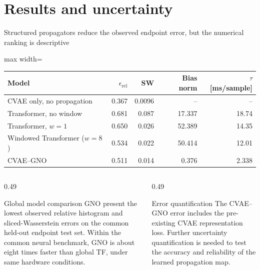 \section{Results and uncertainty}
\begin{frame}[t,shrink=5]{Structured propagators reduce the observed endpoint error, but the numerical ranking is descriptive}
\begin{center}\begin{adjustbox}{max width=\linewidth}
\begin{tabular}{lrrrr}\toprule
Model & $\epsilon_{\mathrm{rel}}$ & SW & Bias norm & $\tau$ [ms/sample]\\\midrule
CVAE only, no propagation & 0.367 & 0.0096 & -- & --\\\midrule
Transformer, no window & 0.681 & 0.087 & 17.337 & 18.74\\
Transformer, $w=1$ & 0.650 & 0.026 & 52.389 & 14.35\\
Windowed Transformer ($w=8$) & 0.534 & 0.022 & 50.414 & 12.01\\
CVAE--GNO & 0.511 & 0.014 & 0.376 & 2.338\\\bottomrule\end{tabular}
\end{adjustbox}\end{center}\begin{columns}[T,onlytextwidth]
\begin{column}{0.49\textwidth}
\begin{block}{Global model comparison}
GNO present the lowest observed relative histogram and sliced-Wasserstein errors on the common held-out endpoint test set. Within the common neural benchmark, GNO is about eight times faster than global TF, under same hardware conditions.
\end{block}

\end{column}
\begin{column}{0.49\textwidth}
\begin{block}{Error quantification}
The CVAE--GNO error includes the pre-existing CVAE representation loss. Further uncertainty quantification is needed to test the accuracy and reliability of the learned propagation map.
\end{block}

\end{column}
\end{columns}


\end{frame}

